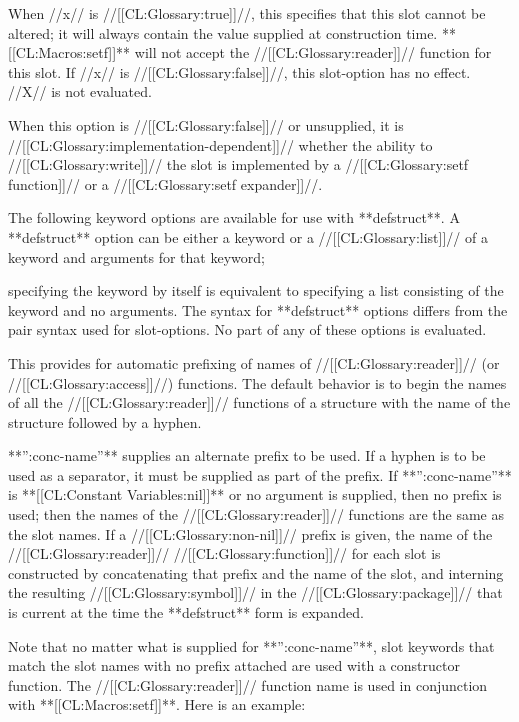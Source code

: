 When //x// is //[[CL:Glossary:true]]//, this specifies that this slot cannot be altered; it will always contain the value supplied at construction time. **[[CL:Macros:setf]]** will not accept the //[[CL:Glossary:reader]]// function for this slot. If //x// is //[[CL:Glossary:false]]//, this slot-option has no effect. //X// is not evaluated.

When this option is //[[CL:Glossary:false]]// or unsupplied, it is //[[CL:Glossary:implementation-dependent]]// whether the ability to //[[CL:Glossary:write]]// the slot is implemented by a //[[CL:Glossary:setf function]]// or a //[[CL:Glossary:setf expander]]//.

\endlist

The following keyword options are available for use with **defstruct**. A **defstruct** option can be either a keyword or a //[[CL:Glossary:list]]// of a keyword and arguments for that keyword;

specifying the keyword by itself is equivalent to specifying a list consisting of the keyword and no arguments. The syntax for **defstruct** options differs from the pair syntax used for slot-options. No part of any of these options is evaluated. \beginlist


This provides for automatic prefixing of names of //[[CL:Glossary:reader]]// (or //[[CL:Glossary:access]]//) functions. The default behavior is to begin the names of all the //[[CL:Glossary:reader]]// functions of a structure with the name of the structure followed by a hyphen.

**'':conc-name''** supplies an alternate prefix to be used. If a hyphen is to be used as a separator, it must be supplied as part of the prefix. If **'':conc-name''** is **[[CL:Constant Variables:nil]]** or no argument is supplied, then no prefix is used; then the names of the //[[CL:Glossary:reader]]// functions are the same as the slot names. If a //[[CL:Glossary:non-nil]]// prefix is given, the name of the //[[CL:Glossary:reader]]// //[[CL:Glossary:function]]// for each slot is constructed by concatenating that prefix and the name of the slot, and interning the resulting //[[CL:Glossary:symbol]]// in the //[[CL:Glossary:package]]// that is current at the time the **defstruct** form is expanded.

Note that no matter what is supplied for **'':conc-name''**, slot keywords that match the slot names with no prefix attached are used with a constructor function. The //[[CL:Glossary:reader]]// function name is used in conjunction with **[[CL:Macros:setf]]**. Here is an example:

